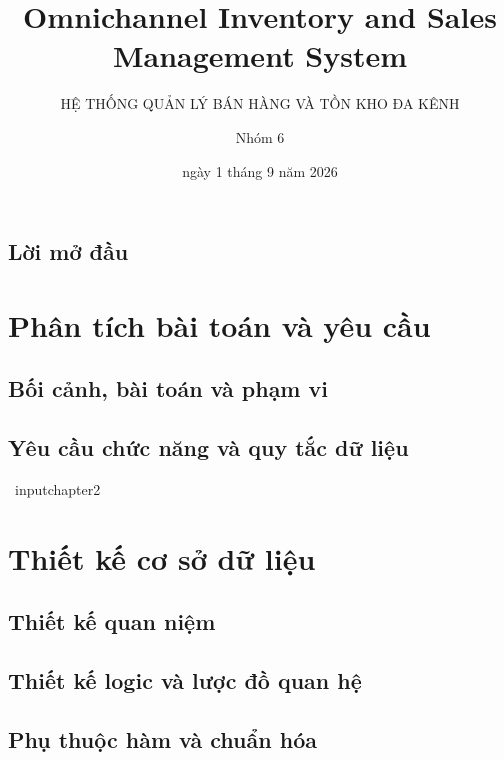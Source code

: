 \documentclass[letterpaper,11pt,leqno]{book}
\begin{document}
\title{Omnichannel Inventory and Sales Management System}

\subtitle{HỆ THỐNG QUẢN LÝ BÁN HÀNG VÀ TỒN KHO ĐA KÊNH}

\author{Nhóm 6}

\date{ngày 1 tháng 9 năm 2026}

\begin{titlepage}
\maketitle
\end{titlepage}

\frontmatter

\tableofcontents

\chapter{Lời mở đầu}
\mainmatter

\part{Phân tích bài toán và yêu cầu}
\chapter{Bối cảnh, bài toán và phạm vi}


\chapter{Yêu cầu chức năng và quy tắc dữ liệu}\
input{chapter2}

\part{Thiết kế cơ sở dữ liệu}

\chapter{Thiết kế quan niệm}


\chapter{Thiết kế logic và lược đồ quan hệ}


\chapter{Phụ thuộc hàm và chuẩn hóa}

\end{document}
